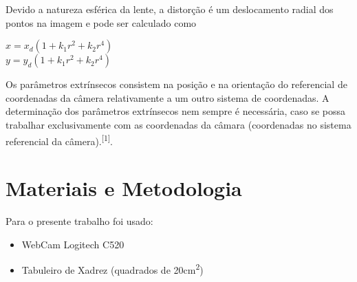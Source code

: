 \documentclass[conference,harvard,brazil,english]{sbatex}
\begin{document}
		 \par Devido a natureza esférica da lente, a distorção é um deslocamento radial dos pontos na imagem e pode ser calculado como
		 \begin{center}
			 $ x = x_{d}(1 + k_{1}r^{2} + k_{2}r^{4}) $\\
			 $ y = y_{d}(1 + k_{1}r^{2} + k_{2}r^{4}) $
		 \end{center}
		 \par Os  parâmetros  extrínsecos  consistem  na  posição  e  na  orientação  do  referencial		 de   coordenadas   da   câmera  relativamente  a  um  outro  sistema  de  coordenadas.  A 		 determinação  dos  parâmetros  extrínsecos  nem  sempre  é  necessária,  caso  se  possa  	 trabalhar  exclusivamente  com  as  coordenadas  da  câmara  (coordenadas  no  sistema  		 referencial  da  câmera).\textsuperscript{[1]}.
		 \section{Materiais e Metodologia}
		 \par Para o presente trabalho foi usado:
		 \begin{itemize}
		 	\item[\Checkmark] WebCam Logitech C520
		 	\item[\Checkmark] Tabuleiro de Xadrez (quadrados de 20cm\textsuperscript{2})
		 	
		 \end{itemize}
		 
\end{document}
